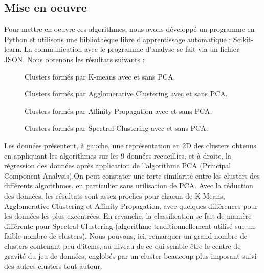 \documentclass[soumission]{ir}
\begin{document}
\subsection{Mise en oeuvre}
Pour mettre en oeuvre ces algorithmes, nous avons développé un programme en Python et utilisons une bibliothèque 
libre d’apprentissage automatique : Scikit-learn. La communication avec le programme d’analyse se fait via un 
fichier JSON. Nous obtenons les résultats suivants :

\begin{figure}[ht]
    \centering

    \caption{Clusters formés par K-means avec et sans PCA.}
    \label{clsuter_kmeans}
\end{figure}

\begin{figure}[ht]
    \centering

    \caption{Clusters formés par Agglomerative Clustering avec et sans PCA.}
    \label{clsuter_agglo}
\end{figure}

\begin{figure}[ht]
    \centering

    \caption{Clusters formés par Affinity Propagation avec et sans PCA.}
    \label{clsuter_affinity}
\end{figure}

\begin{figure}[ht]
    \centering

    \caption{Clusters formés par Spectral Clustering avec et sans PCA.}
    \label{clsuter_spectral}
\end{figure}

Les données présentent, à gauche, une représentation en 2D des clusters obtenus en appliquant les algorithmes 
sur les 9 données recueillies, et à droite, la régression des données après application de l’algorithme PCA 
(Principal Component Analysis).On peut constater une forte similarité entre les clusters des différents 
algorithmes, en particulier sans utilisation de PCA. Avec la réduction des données, les résultats sont assez 
proches pour chacun de K-Means, Agglomerative Clustering et Affinity Propagation, avec quelques différences pour
 les données les plus excentrées. En revanche, la classification se fait de manière différente pour Spectral 
 Clustering (algorithme traditionnellement utilisé sur un faible nombre de clusters). Nous pouvons, ici, 
 remarquer un grand nombre de clusters contenant peu d’items, au niveau de ce qui semble être le centre de 
 gravité du jeu de données, englobés par un cluster beaucoup plus imposant suivi des autres clusters tout autour.
\end{document}
